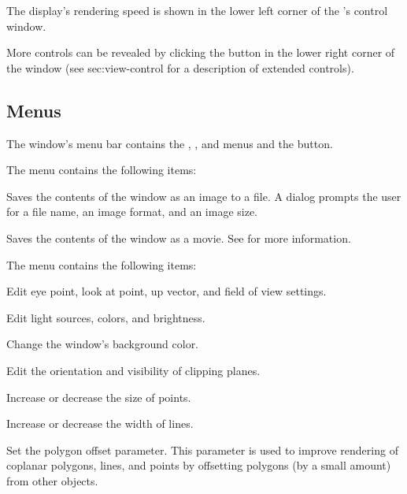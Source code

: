 The display's rendering speed is shown in the lower left corner of the
\viewer{}'s control window.  

More controls can be revealed by clicking the
\latexhtml{\fbox{+}}{\button{[+]}} button in the lower right corner of
the \viewer{} window (see 
{sec:view-control} for a description of extended controls).


\subsection{Menus}

The \viewer{} window's menu bar contains the , ,
and  menus and the  button.

\begin{description}
   The  menu contains the following items:

  \begin{description}
     Saves the contents of the \viewer{}
    window as an image to a file.  A dialog prompts the user for a
    file name, an image format, and an image size.
    
     Saves the contents of the \viewer{}
    window as a movie.  See  for more information.
  \end{description}
  
   The  menu contains the following items:
  \begin{description}
     Edit eye point, look
    at point, up vector, and field of view settings.

     Edit light sources,
    colors, and brightness.

     Change the \viewer{}
    window's background color.

     Edit the orientation and visibility
    of clipping planes.

     Increase or decrease the size of points.

     Increase or decrease the width of lines.
    
     Set the polygon offset parameter.
    This parameter is used to improve rendering of coplanar
    polygons, lines, and points by offsetting polygons (by a small
    amount) from other objects.


\end{description}
\end{description}
